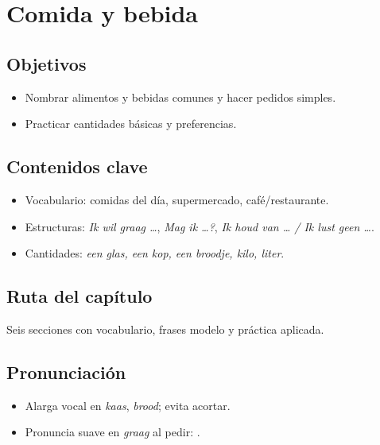 \chapter{Comida y bebida}
\section{Objetivos}
\begin{itemize}[leftmargin=*]
	\item Nombrar alimentos y bebidas comunes y hacer pedidos simples.
	\item Practicar cantidades básicas y preferencias.
\end{itemize}

\section{Contenidos clave}
\begin{itemize}[leftmargin=*]
	\item Vocabulario: comidas del día, supermercado, café/restaurante.
	\item Estructuras: \textit{Ik wil graag \ldots{}}, \textit{Mag ik \ldots{}?}, \textit{Ik houd van \ldots{} / Ik lust geen \ldots{}}.
	\item Cantidades: \textit{een glas, een kop, een broodje, kilo, liter}.
\end{itemize}

\section{Ruta del capítulo}
Seis secciones con vocabulario, frases modelo y práctica aplicada.








\section{Pronunciación}
\begin{itemize}[leftmargin=*]
	\item Alarga vocal en \textit{kaas}, \textit{brood}; evita acortar.
	\item Pronuncia  suave en \textit{graag} al pedir: .
\end{itemize}

